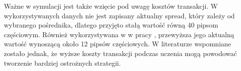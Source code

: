 \documentclass[twoside]{iisthesis}
\begin{document}
Ważne w symulacji jest także wzięcie pod uwagę kosztów transakcji. W wykorzystywanych danych nie jest zapisany aktualny spread, który zależy od wybranego pośrednika, dlatego przyjęto stałą wartość równą 40 pipsom częściowym. Również wykorzystywana w w pracy \cite{Bicz}, przewyższa jego aktualną wartość wynoszącą około 12 pipsów częściowych. W literaturze wspomniane zostało jednak, że wyższe koszty transakcji podczas uczenia mogą powodować tworzenie bardziej ostrożnych strategii. 


































\end{document}
